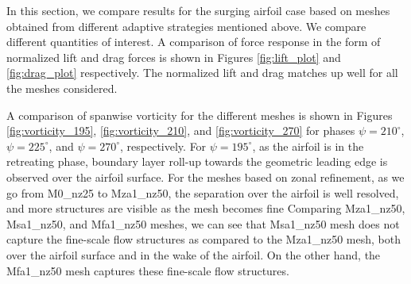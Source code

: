 In this section, we compare results for the surging airfoil case based on meshes obtained from different adaptive strategies mentioned above. 
We compare different quantities of interest. 
A comparison of force response in the form of normalized lift and drag forces is shown in Figures \ref{fig:lift_plot} and \ref{fig:drag_plot} respectively. The normalized lift and drag matches up well for all the meshes considered.

A comparison of spanwise vorticity for the different meshes is shown in Figures \ref{fig:vorticity_195}, \ref{fig:vorticity_210}, and \ref{fig:vorticity_270} for phases $\psi=210^\circ$, $\psi=225^\circ$, and $\psi=270^\circ$, respectively.
For $\psi=195^\circ$, as the airfoil is in the retreating phase, boundary layer roll-up towards the geometric leading edge is observed over the airfoil surface.
For the meshes based on zonal refinement, as we go from M0\_nz25 to Mza1\_nz50, the separation over the airfoil is well resolved, and more structures are visible as the mesh becomes fine
Comparing Mza1\_nz50, Msa1\_nz50, and Mfa1\_nz50 meshes, we can see that Msa1\_nz50 mesh does not capture the fine-scale flow structures as compared to the Mza1\_nz50 mesh, both over the airfoil surface and in the wake of the airfoil. 
On the other hand, the Mfa1\_nz50 mesh captures these fine-scale flow structures.

